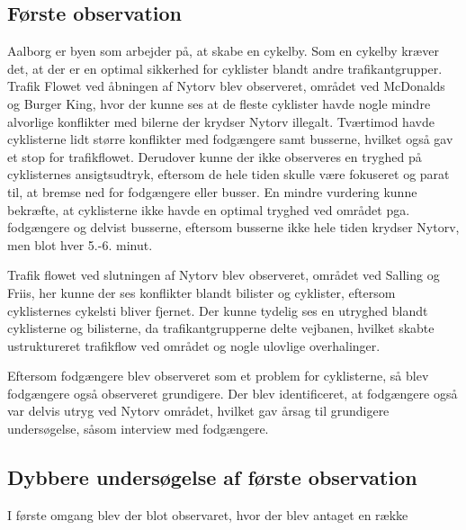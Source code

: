 \subsection{Første observation}
\label{sub:foerste_obs}
Aalborg er byen som arbejder på, at skabe en cykelby.%
Som en cykelby kræver det, at der er en optimal sikkerhed for cyklister blandt andre trafikantgrupper. Trafik Flowet ved åbningen af Nytorv blev observeret, området ved McDonalds og Burger King, hvor der kunne ses at de fleste cyklister havde nogle mindre alvorlige konflikter med bilerne der krydser Nytorv illegalt. Tværtimod havde cyklisterne lidt større konflikter med fodgængere samt busserne, hvilket også gav et stop for trafikflowet. Derudover kunne der ikke observeres en tryghed på cyklisternes ansigtsudtryk, eftersom de hele tiden skulle være fokuseret og parat til, at bremse ned for fodgængere eller busser. En mindre vurdering kunne bekræfte, at cyklisterne ikke havde en optimal tryghed ved området pga. fodgængere og delvist busserne, eftersom busserne ikke hele tiden krydser Nytorv, men blot hver 5.-6. minut.

Trafik flowet ved slutningen af Nytorv blev observeret, området ved Salling og Friis, her kunne der ses konflikter blandt bilister og cyklister, eftersom cyklisternes cykelsti bliver fjernet. Der kunne tydelig ses en utryghed blandt cyklisterne og bilisterne, da trafikantgrupperne delte vejbanen, hvilket skabte ustruktureret trafikflow ved området og nogle ulovlige overhalinger.

Eftersom fodgængere blev observeret som et problem for cyklisterne, så blev fodgængere også observeret grundigere. Der blev identificeret, at fodgængere også var delvis utryg ved Nytorv området, hvilket gav årsag til grundigere undersøgelse, såsom interview med fodgængere.

\subsection{Dybbere undersøgelse af første observation}
\label{sub:def_konflikt}
I første omgang blev der blot observaret, hvor der blev antaget en række
